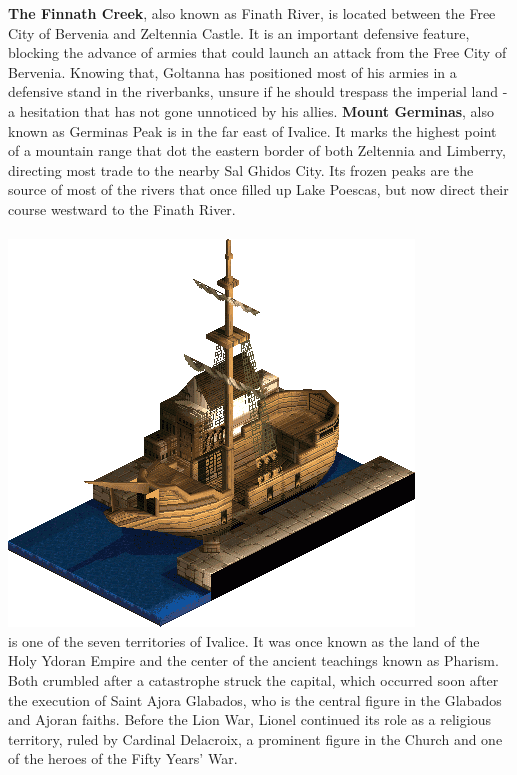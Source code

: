 %
\textbf{The Finnath Creek}, also known as Finath River, is located between the Free City of Bervenia and Zeltennia Castle. 
It is an important defensive feature, blocking the advance of armies that could launch an attack from the Free City of Bervenia.
Knowing that, Goltanna has positioned most of his armies in a defensive stand in the riverbanks, unsure if he should trespass the imperial land - a hesitation that has not gone unnoticed by his allies.
\textbf{Mount Germinas}, also known as Germinas Peak is in the far east of Ivalice. It marks the highest point of a mountain range that dot
the eastern border of both Zeltennia and Limberry, directing most trade to the nearby Sal Ghidos City. 
Its frozen peaks are the source of most of the rivers that once filled up Lake Poescas, but now direct their course westward to the Finath River.
%
\\\\
\includegraphics[width=\columnwidth]{./art/images/warjilis.png}
\\
%
 is one of the seven territories of Ivalice. 
It was once known as the land of the Holy Ydoran Empire and the center of the ancient teachings known as Pharism.
Both crumbled after a catastrophe struck the capital, which occurred soon after the execution of Saint Ajora Glabados, who is the central figure in the Glabados and Ajoran faiths. 
Before the Lion War, Lionel continued its role as a religious territory, ruled by Cardinal Delacroix, a prominent figure in the Church and one of the heroes of the Fifty Years' War. 
